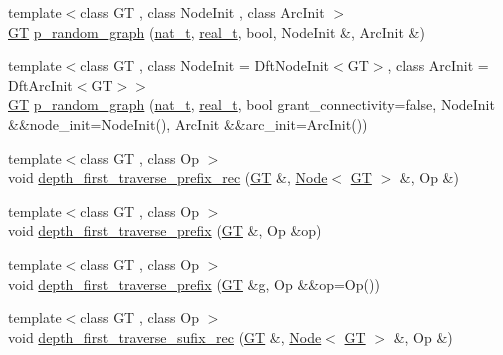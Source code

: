 \begin{DoxyCompactItemize}
\item 
{\footnotesize template$<$class GT , class Node\+Init , class Arc\+Init $>$ }\\\hyperlink{demo-buildgraph_8_c_a3001c40d2c31ca87ed96cd7d1334a55e}{GT} \hyperlink{namespace_designar_ad69b4cdb00633579b1ed7b47bd8dc00a}{p\+\_\+random\+\_\+graph} (\hyperlink{namespace_designar_aa72662848b9f4815e7bf31a7cf3e33d1}{nat\+\_\+t}, \hyperlink{namespace_designar_aca2c32af26808dbec1f3a3071fad25ce}{real\+\_\+t}, bool, Node\+Init \&, Arc\+Init \&)
\item 
{\footnotesize template$<$class GT , class Node\+Init  = Dft\+Node\+Init$<$\+G\+T$>$, class Arc\+Init  = Dft\+Arc\+Init$<$\+G\+T$>$$>$ }\\\hyperlink{demo-buildgraph_8_c_a3001c40d2c31ca87ed96cd7d1334a55e}{GT} \hyperlink{namespace_designar_a55d69e396be9526992246c78526d7c36}{p\+\_\+random\+\_\+graph} (\hyperlink{namespace_designar_aa72662848b9f4815e7bf31a7cf3e33d1}{nat\+\_\+t}, \hyperlink{namespace_designar_aca2c32af26808dbec1f3a3071fad25ce}{real\+\_\+t}, bool grant\+\_\+connectivity=false, Node\+Init \&\&node\+\_\+init=Node\+Init(), Arc\+Init \&\&arc\+\_\+init=Arc\+Init())
\item 
{\footnotesize template$<$class GT , class Op $>$ }\\void \hyperlink{namespace_designar_a0b89964c32afcc315905100d3ae49ad6}{depth\+\_\+first\+\_\+traverse\+\_\+prefix\+\_\+rec} (\hyperlink{demo-buildgraph_8_c_a3001c40d2c31ca87ed96cd7d1334a55e}{GT} \&, \hyperlink{namespace_designar_a5af326c65aa2bd26b26c410f2030d09e}{Node}$<$ \hyperlink{demo-buildgraph_8_c_a3001c40d2c31ca87ed96cd7d1334a55e}{GT} $>$ \&, Op \&)
\item 
{\footnotesize template$<$class GT , class Op $>$ }\\void \hyperlink{namespace_designar_a2c0d9c0ea5841058afe514c4451ab869}{depth\+\_\+first\+\_\+traverse\+\_\+prefix} (\hyperlink{demo-buildgraph_8_c_a3001c40d2c31ca87ed96cd7d1334a55e}{GT} \&, Op \&op)
\item 
{\footnotesize template$<$class GT , class Op $>$ }\\void \hyperlink{namespace_designar_afaa79311647a603f5c95d575f67ea767}{depth\+\_\+first\+\_\+traverse\+\_\+prefix} (\hyperlink{demo-buildgraph_8_c_a3001c40d2c31ca87ed96cd7d1334a55e}{GT} \&g, Op \&\&op=Op())
\item 
{\footnotesize template$<$class GT , class Op $>$ }\\void \hyperlink{namespace_designar_ab028f52b5df8eed5dadeda85d45fa0f2}{depth\+\_\+first\+\_\+traverse\+\_\+sufix\+\_\+rec} (\hyperlink{demo-buildgraph_8_c_a3001c40d2c31ca87ed96cd7d1334a55e}{GT} \&, \hyperlink{namespace_designar_a5af326c65aa2bd26b26c410f2030d09e}{Node}$<$ \hyperlink{demo-buildgraph_8_c_a3001c40d2c31ca87ed96cd7d1334a55e}{GT} $>$ \&, Op \&)

\end{DoxyCompactItemize}
